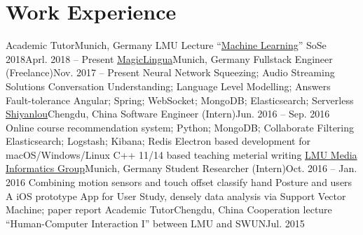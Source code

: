 \section{\textbf{Work Experience}}
  \resumeSubHeadingListStart
    \resumeSubheading
      {Academic Tutor}{Munich, Germany}
      {LMU Lecture ``\href{http://www.dbs.ifi.lmu.de/cms/studium_lehre/lehre_master/ml18/index.html}{Machine Learning}'' SoSe 2018}{Aprl. 2018 -- Present}
    \resumeSubheading
    {\href{https://magiclingua.com/}{MagicLingua}}{Munich, Germany}
    {Fullstack Engineer (Freelance)}{Nov. 2017 -- Present}
    \resumeItemListStart
        {Neural Network Squeezing; Audio Streaming Solutions}
        {Conversation Understanding; Language Level Modelling; Answers Fault-tolerance}
        {Angular; Spring; WebSocket; MongoDB; Elasticsearch; Serverless}
    \resumeItemListEnd
    \resumeSubheading
      {\href{https://shiyanlou.com/}{Shiyanlou}}{Chengdu, China}
      {Software Engineer (Intern)}{Jun. 2016 -- Sep. 2016}
      \resumeItemListStart
          {Online course recommendation system; Python; MongoDB; Collaborate Filtering}
          {Elasticsearch; Logstash; Kibana; Redis}
          {Electron based development for macOS/Windows/Linux}
          {C++ 11/14 based teaching meterial writing}
      \resumeItemListEnd
    \resumeSubheading
      {\href{http://www.medien.ifi.lmu.de}{LMU Media Informatics Group}}{Munich, Germany}
      {Student Researcher (Intern)}{Oct. 2016 -- Jan. 2016}
      \resumeItemListStart
          {Combining motion sensors and touch offset classify hand Posture and users}
          {A iOS prototype App for User Study, densely data analysis via Support Vector Machine; paper report}
      \resumeItemListEnd
    \resumeSubheading
      {Academic Tutor}{Chengdu, China}
      {Cooperation lecture “Human-Computer Interaction I” between LMU and SWUN}{Jul. 2015}
  \resumeSubHeadingListEnd